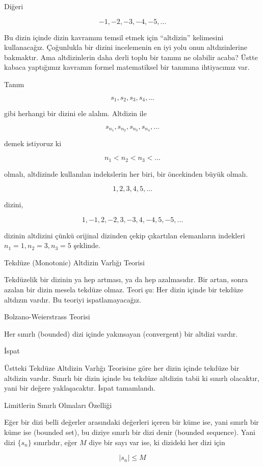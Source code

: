 \documentclass[12pt,fleqn]{article}\usepackage{../../common}
\begin{document}
Diğeri 

$$ -1, -2, -3, -4, -5, ... $$

Bu dizin içinde dizin kavramını temsil etmek için ``altdizin'' kelimesini
kullanacağız. Çoğunlukla bir dizini incelemenin en iyi yolu onun
altdızinlerine bakmaktır. Ama altdizinlerin daha derli toplu bir tanımı ne
olabilir acaba? Üstte kabaca yaptığımız kavramın formel matematiksel bir
tanımına ihtiyacımız var. 

Tanım

$$ s_1, s_2,s_3,s_4,...$$

gibi herhangi bir dizini ele alalım. Altdizin ile 

$$ s_{n_1},s_{n_2},s_{n_3},s_{n_4},... $$

demek istiyoruz ki

$$ n_1 < n_2 < n_3 < ... $$

olmalı, altdizinde kullanılan indekslerin her biri, bir öncekinden büyük
olmalı. 

$$ 1, 2, 3, 4, 5, ... $$

dizini, 

$$ 1, -1, 2, -2, 3, -3, 4, -4, 5, -5, . . . $$

dizinin altdizini çünkü orijinal dizinden çekip çıkartılan elemanların
indekleri $n_1=1,n_2 = 3,n_3 = 5$ şeklinde. 

Tekdüze (Monotonic) Altdizin Varlığı Teorisi

Tekdüzelik bir dizinin ya hep artması, ya da hep azalmasıdır. Bir artan,
sonra azalan bir dizin mesela tekdüze olmaz. Teori şu: Her dizin içinde
bir tekdüze altdızın vardır. Bu teoriyi ispatlamayacağız. 

Bolzano-Weierstrass Teorisi 

Her sınırlı (bounded) dizi içinde yakınsayan (convergent) bir altdizi
vardır. 

İspat

Üstteki Tekdüze Altdizin Varlığı Teorisine göre her dizin içinde tekdüze
bir altdizin vardır. Sınırlı bir dizin içinde bu tekdüze altdizin tabii ki
sınırlı olacaktır, yani bir değere yaklaşacaktır. İspat tamamlandı.

Limitlerin Sınırlı Olmaları Özelliği 

Eğer bir dizi belli değerler arasındaki değerleri içeren bir küme ise, yani
sınırlı bir küme ise (bounded set), bu diziye sınırlı bir dizi denir
(bounded sequence). Yani dizi $\{s_n\}$ sınırlıdır, eğer $M$ diye bir sayı
var ise, ki dizideki her dizi için 

$$ |s_n| \le M $$
\end{document}
